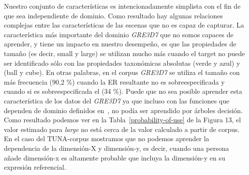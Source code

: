 Nuestro conjunto de caracter\'{i}sticas es intencionadamente simplista con el fin de que sea
independiente de dominio. Como resultado hay algunas relaciones complejas
entre las caracter\'{i}sticas de las escenas que no es capaz de
capturar. La caracter\'{i}stica m\'as importante del dominio \textit{GRE3D7}
que no somos capaces de aprender, y tiene un impacto en nuestro desempe\~no, es que
las propiedades de tama\~no (es decir, small y large) se utilizan mucho
m\'as cuando el target no puede ser identificado s\'olo con las propiedades taxon\'omicas absolutas 
(verde y azul) y (ball y cube). En otras palabras, en el corpus \textit{GRE3D7} se utiliza el tama\~no con m\'as frecuencia (90,2 \%)
cuando la ER resultante no es sobreespecificada y cuando si es sobreespecificada el (34 \%). 
Puede que no sea posible aprender esta caracter\'{i}stica de los
datos del \textit{GRE3D7} ya que incluso con las funciones que dependen de dominio definidos
en~\cite[Cap\'{i}tulo 6] {viet:gene11}, no pod\'{i}a ser aprendido por \'arboles decisi\'on. 
Como resultado podemos ver en la Tabla~\ref{probability-of-use} de la Figura 13, el valor estimado para 
\emph{large} no est\'a cerca de la
valor calculado a partir de corpus. En el caso del TUNA-corpus
  mostramos que no podemos aprender la dependencia de la dimensi\'on-X y
  dimensi\'on-y, es decir, cuando una persona a\~nade dimensi\'on-x es altamente
  probable que incluya la dimensi\'on-y en su expresi\'on referencial.

